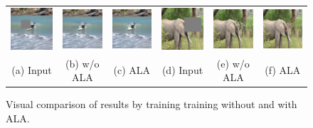 \begin{figure}[h!]
\centering
\small
\begin{tabular}{cccccc}
\includegraphics[width=.16\textwidth]{figures/ALA/000000063154_input_image.jpg}&
\includegraphics[width=.16\textwidth]{figures/ALA/000000063154_synthesized_image.jpg}&
\includegraphics[width=.16\textwidth]{figures/ALA/000000063154_synthesized_image-1.jpg}&
\includegraphics[width=.16\textwidth]{figures/ALA/000000475779_input_image.jpg}&
\includegraphics[width=.16\textwidth]{figures/ALA/000000475779_synthesized_image.jpg}&
\includegraphics[width=.16\textwidth]{figures/ALA/000000475779_synthesized_image-1.jpg}\\
(a) Input & (b) w/o ALA & (c) ALA & (d) Input & (e) w/o ALA & (f) ALA \\
\end{tabular}
\caption{Visual comparison of results by training training without and with ALA.}
\label{fig:ala}
\vspace{-15pt}
\end{figure}  


